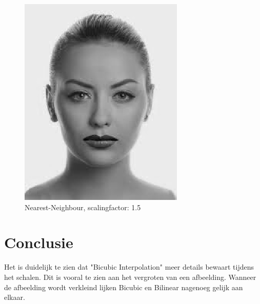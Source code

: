 \documentclass{article}
\begin{document}
    \begin{figure}[H]
      \centering
      \includegraphics[]{assets/Nearest_Female_15.png}
      \caption{Nearest-Neighbour, scalingfactor: 1.5}
      \label{fig:sub3}
    \end{figure}
    
\section{Conclusie}
Het is duidelijk te zien dat "Bicubic Interpolation" meer details bewaart tijdens het schalen. Dit is vooral te zien aan het vergroten van een afbeelding. Wanneer de afbeelding wordt verkleind lijken Bicubic en Bilinear nagenoeg gelijk aan elkaar.
\end{document}
